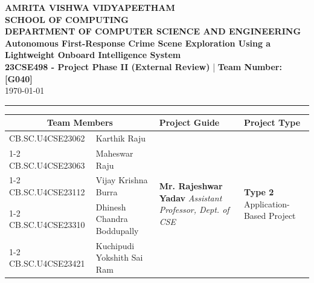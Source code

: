 \documentclass[11pt, a4paper]{article}
\begin{document}
\noindent
\begin{minipage}{\textwidth}
    \centering
    {\Large \textbf{\textcolor{amritaMaroon}{
    AMRITA VISHWA VIDYAPEETHAM \\
    SCHOOL OF COMPUTING \\
    DEPARTMENT OF COMPUTER SCIENCE AND ENGINEERING \\
    }}}
    \vspace{0.2cm}
    {\large \textbf{Autonomous First-Response Crime Scene Exploration Using a Lightweight Onboard Intelligence System}} \\[0.1cm]
    \textbf{23CSE498 - Project Phase II (External Review)} \quad | \quad \textbf{Team Number: [G040]} \\
    \today
\end{minipage}

\vspace{0.3cm}
\hrule
\vspace{0.3cm}

\noindent
\begin{center}
    \renewcommand{\arraystretch}{1.45}
    \setlength{\tabcolsep}{6pt}
    \begin{tabular}{|l|p{4.8cm}|p{4.6cm}|p{3.2cm}|}
        \hline
        \multicolumn{2}{|c|}{\textbf{Team Members}} & \textbf{Project Guide} & \textbf{Project Type} \\
        \hline
        \small CB.SC.U4CSE23062 & \small \raggedright Karthik Raju &
        \multirow{5}{=}{\raggedright \small \textbf{Mr. Rajeshwar Yadav} \newline \textit{Assistant Professor, \newline Dept. of CSE}} &
        \multirow{5}{=}{\raggedright \small \textbf{Type 2} \newline Application-Based Project} \\ \cline{1-2}
        \small CB.SC.U4CSE23063 & \small Maheswar Raju & & \\ \cline{1-2}
        \small CB.SC.U4CSE23112 & \small Vijay Krishna Burra & & \\ \cline{1-2}
        \small CB.SC.U4CSE23310 & \small Dhinesh Chandra Boddupally & & \\ \cline{1-2}
        \small CB.SC.U4CSE23421 & \small Kuchipudi Yokshith Sai Ram & & \\
        \hline
    \end{tabular}
\end{center}
\vspace{0.2cm}
\end{document}
